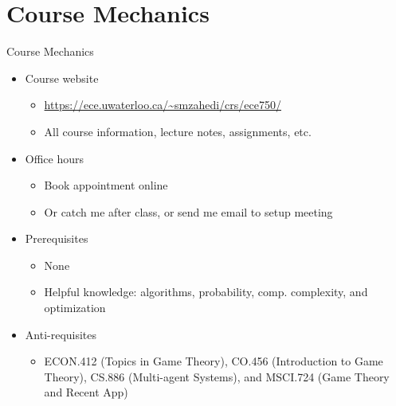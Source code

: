 \documentclass[11pt,aspectratio=169]{beamer}
\subtitle{\vspace{2.1em}Lecture 1: Introduction}
\begin{document}
 \begin{frame}[plain]
  \titlepage
 \end{frame}
 
 \section{Course Mechanics}
  \begin{frame}{Course Mechanics}
   \begin{itemize}[<+->]
    \setlength{\itemsep}{1em}
    \item Course website
    \begin{itemize}[<.->]
     \item \href{https://ece.uwaterloo.ca/~smzahedi/crs/ece750}{\url{https://ece.uwaterloo.ca/~smzahedi/crs/ece750/}}
     \item All course information, lecture notes, assignments, etc.  
    \end{itemize}   
    \item Office hours
    \begin{itemize}[<.->]
     \item Book appointment online
     \item Or catch me after class, or send me email to setup meeting
    \end{itemize}
    \item Prerequisites 
    \begin{itemize}[<.->]
    	 \item None
     \item Helpful knowledge: algorithms, probability, comp. complexity, and optimization
    \end{itemize} 
    \item Anti-requisites 
    \begin{itemize}[<.->]
     \item ECON.412 (Topics in Game Theory), CO.456 (Introduction to Game Theory), CS.886 (Multi-agent Systems), and MSCI.724 (Game Theory and Recent App)
    \end{itemize} 
   \end{itemize}
  \end{frame}
 
\end{document}
